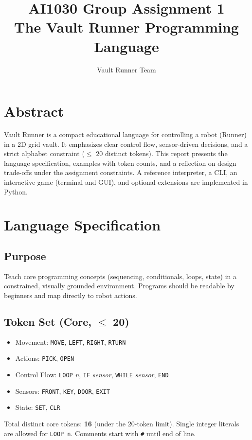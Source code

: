\documentclass[11pt,a4paper]{article}
\title{AI1030 Group Assignment 1\\The Vault Runner Programming Language}
\author{Vault Runner Team}
\date{}
\begin{document}
\maketitle

\section*{Abstract}
Vault Runner is a compact educational language for controlling a robot (Runner) in a 2D grid vault. It emphasizes clear control flow, sensor-driven decisions, and a strict alphabet constraint (\(\leq\) 20 distinct tokens). This report presents the language specification, examples with token counts, and a reflection on design trade-offs under the assignment constraints. A reference interpreter, a CLI, an interactive game (terminal and GUI), and optional extensions are implemented in Python.

\section{Language Specification}
\subsection{Purpose}
Teach core programming concepts (sequencing, conditionals, loops, state) in a constrained, visually grounded environment. Programs should be readable by beginners and map directly to robot actions.

\subsection{Token Set (Core, \(\leq\) 20)}
\begin{itemize}[noitemsep]
  \item Movement: \texttt{MOVE}, \texttt{LEFT}, \texttt{RIGHT}, \texttt{RTURN}
  \item Actions: \texttt{PICK}, \texttt{OPEN}
  \item Control Flow: \texttt{LOOP} \textit{n}, \texttt{IF} \textit{sensor}, \texttt{WHILE} \textit{sensor}, \texttt{END}
  \item Sensors: \texttt{FRONT}, \texttt{KEY}, \texttt{DOOR}, \texttt{EXIT}
  \item State: \texttt{SET}, \texttt{CLR}
\end{itemize}
Total distinct core tokens: \textbf{16} (under the 20-token limit). Single integer literals are allowed for \texttt{LOOP n}. Comments start with \texttt{\#} until end of line.
\end{document}
